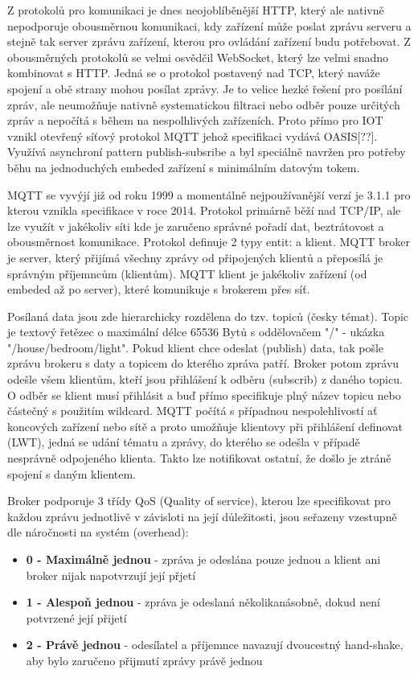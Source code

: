 Z protokolů pro komunikaci je dnes neojoblíběnější HTTP, který ale nativně nepodporuje obousměrnou komunikaci, kdy zařízení může poslat zprávu serveru a stejně tak server zprávu zařízení, kterou pro ovládání zařízení budu potřebovat. Z obousměrných protokolů se velmi osvědčil WebSocket, který lze velmi snadno kombinovat s HTTP. Jedná se o protokol postavený nad TCP, který naváže spojení a obě strany mohou posílat zprávy. Je to velice hezké řešení pro posílání zpráv, ale neumožňuje nativně systematickou filtraci nebo odběr pouze určitých zpráv a nepočítá s během na nespolhlivých zařízeních. Proto přímo pro IOT vznikl otevřený síťový protokol MQTT jehož specifikaci vydává OASIS[??]. Využívá asynchroní pattern publish-subsribe a byl speciálně navržen pro potřeby běhu na jednoduchých embeded zařízení s minimálním datovým tokem.

MQTT se vyvýjí již od roku 1999 a momentálně nejpoužívanější verzí je 3.1.1 pro kterou vznikla specifikace v roce 2014. Protokol primárně běží nad TCP/IP, ale lze využít v jakékoliv síti kde je zaručeno správné pořadí dat, beztrátovost a obousměrnost komunikace. Protokol definuje 2 typy entit:  a klient. MQTT broker je server, který přijímá všechny zprávy od připojených klientů a přeposílá je správným příjemncům (klientům). MQTT klient je jakékoliv zařízení (od embeded až po server), které komunikuje s brokerem přes síť.

Posílaná data jsou zde hierarchicky rozdělena do tzv. topiců (česky témat). Topic je textový řetězec o maximální délce 65536 Bytů s oddělovačem "/" - ukázka "/house/bedroom/light". Pokud klient chce odeslat (publish) data, tak pošle zprávu brokeru s daty a topicem do kterého zpráva patří. Broker potom zprávu odešle všem klientům, kteří jsou přihlášení k odběru (subscrib) z daného topicu. O odběr se klient musí přihlásit a buď přímo specifikuje plný název topicu nebo částečný s použitím wildcard. MQTT počítá s případnou nespolehlivostí ať koncových zařízení nebo sítě a proto umožňuje klientovy při přihlášení definovat  (LWT), jedná se udání tématu a zprávy, do kterého se odešla v případě nesprávně odpojeného klienta. Takto lze notifikovat ostatní, že došlo je ztráně spojení s daným klientem.

Broker podporuje 3 třídy QoS (Quality of service), kterou lze specifikovat pro každou zprávu jednotlivě v závisloti na její důležitosti, jsou seřazeny vzestupně dle náročnosti na systém (overhead):
\begin{itemize}
    \item \textbf{0 - Maximálně jednou} - zpráva je odeslána pouze jednou a klient ani broker nijak napotvrzují její přjetí
    \item \textbf{1 - Alespoň jednou} - zpráva je odeslaná několikanásobně, dokud není potvrzené její přijetí
    \item \textbf{2 - Právě jednou} - odesílatel a příjemnce navazují dvoucestný hand-shake, aby bylo zaručeno přijmutí zprávy právě jednou
\end{itemize}

